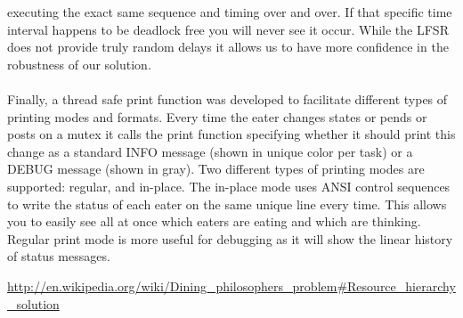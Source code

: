 \documentclass[12pt]{article}
\begin{document}
executing the exact same sequence and timing over and over. If that specific time interval
happens to be deadlock free you will never see it occur.  While the LFSR does not provide 
truly random delays it allows us to have more confidence in the robustness of our solution.
\\\\
Finally, a thread safe print function was developed to facilitate different types of printing
modes and formats. Every time the eater changes states or pends or posts on a mutex it calls
the print function specifying whether it should print this change as a standard INFO message
(shown in unique color per task) or a DEBUG message (shown in gray). Two different types of 
printing modes are supported: regular, and in-place.  The in-place mode uses ANSI control 
sequences to write the status of each eater on the same unique line every time. This allows 
you to easily see all at once which eaters are eating and which are thinking. Regular print mode 
is more useful for debugging as it will show the linear history of status messages.

\begin{thebibliography}{9}
     \url{http://en.wikipedia.org/wiki/Dining_philosophers_problem#Resource_hierarchy_solution}
\end{thebibliography}
\end{document}
